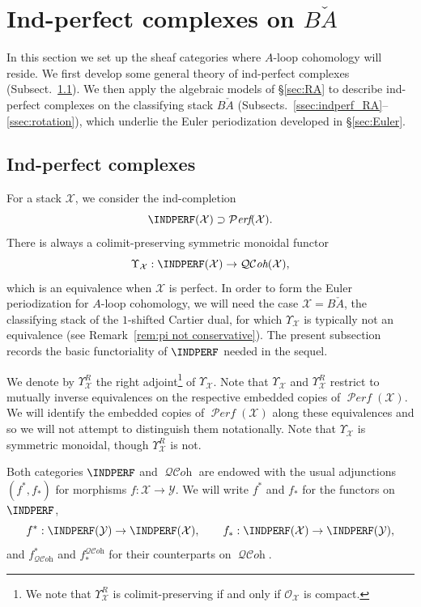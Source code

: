 \documentclass[12pt, oneside]{amsart}
\numberwithin{equation}{section}
\theoremstyle{remark}
\theoremstyle{plain}
\DeclareMathOperator{\QCOH}{\mathcal{QC}\textit{oh}}
\DeclareMathOperator{\PERF}{\mathcal{P}\textit{erf}}
\newcommand{\OO}{\mathcal{O}}
\newcommand{\YY}{\mathcal{Y}}
\newcommand{\XX}{\mathcal{X}}
\newcommand{\Ren}{\Upsilon}
\begin{document}
\section{Ind-perfect complexes on $B\check{A}$}\label{sec:BcheckA}

In this section we set up the sheaf categories where $A$-loop cohomology will reside.
We first develop some general theory of ind-perfect complexes (Subsect.~\ref{ssec:indperf}).
We then apply the algebraic models of \S\ref{sec:RA} to describe ind-perfect complexes on the classifying stack $B\check{A}$ (Subsects.~\ref{ssec:indperf_RA}--\ref{ssec:rotation}), which underlie the Euler periodization developed in \S \ref{sec:Euler}.

\subsection{Ind-perfect complexes}
\label{ssec:indperf}

For a stack $\XX$, we consider the ind-completion
$$\INDPERF(\XX) \supset \PERF(\XX).$$
There is always a colimit-preserving symmetric monoidal functor
$$\Ren_\XX : \INDPERF(\XX) \to \QCOH(\XX),$$
which is an equivalence when $\XX$ is perfect. In order to form the Euler periodization for $A$-loop cohomology, we will need the case $\XX = B\check{A}$, the classifying stack of the $1$-shifted Cartier dual, for which $\Ren_\XX$ is typically not an equivalence (see Remark~\ref{rem:pi not conservative}). The present subsection records the basic functoriality of $\INDPERF$ needed in the sequel.

We denote by $\Ren_\XX^R$ the right adjoint\footnote{We note that $\Ren_\XX^R$ is colimit-preserving if and only if $\OO_\XX$ is compact.} of $\Ren_\XX$.
Note that $\Ren_\XX$ and $\Ren_\XX^R$ restrict to mutually inverse equivalences on the respective embedded copies of $\PERF(\XX)$. We will identify the embedded copies of $\PERF(\XX)$ along these equivalences and so we will not attempt to distinguish them notationally. Note that $\Ren_\XX$ is symmetric monoidal, though $\Ren_\XX^R$ is not.

Both categories $\INDPERF$ and $\QCOH$ are endowed with the usual adjunctions $(f^*, f_*)$ for morphisms $f:\XX\rightarrow\YY$. We will write $f^*$ and $ f_*$ for the functors on $\INDPERF$,
$$ f^* : \INDPERF(\YY) \to \INDPERF(\XX), \qquad f_* : \INDPERF(\XX) \to \INDPERF(\YY), $$
and $f^*_{\QCOH}$ and $f_*^{\QCOH}$ for their counterparts on $\QCOH$.
\end{document}
